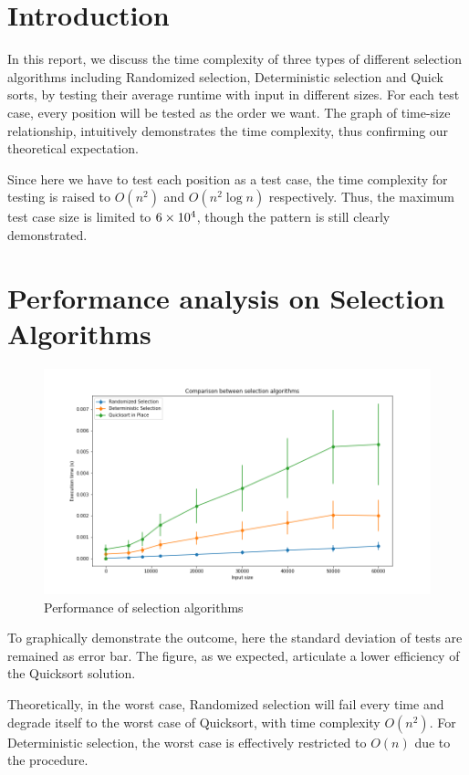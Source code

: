 
\section{Introduction}
In this report, we discuss the time complexity of three types of different selection algorithms including Randomized selection, Deterministic selection and Quick sorts, by testing their average runtime with input in different sizes. For each test case, every position will be tested as the order we want. The graph of time-size relationship, intuitively demonstrates the time complexity, thus confirming our theoretical expectation.

Since here we have to test each position as a test case, the time complexity for testing is raised to $O(n^2)$ and $O(n^2\log n)$ respectively. Thus, the maximum test case size is limited to $6\times10^{4}$, though the pattern is still clearly demonstrated.

\section{Performance analysis on Selection Algorithms}
\begin{figure}[H]
    \centering
    \includegraphics[width=0.75\linewidth]{../a2/test/res}
    \caption{Performance of selection algorithms}\label{res}
\end{figure}
To graphically demonstrate the outcome, here the standard deviation of tests are remained as error bar. The figure, as we expected, articulate a lower efficiency of the Quicksort solution.

Theoretically, in the worst case, Randomized selection will fail every time and degrade itself to the worst case of Quicksort, with time complexity $O(n^2)$. For Deterministic selection, the worst case is effectively restricted to $O(n)$ due to the  procedure.

